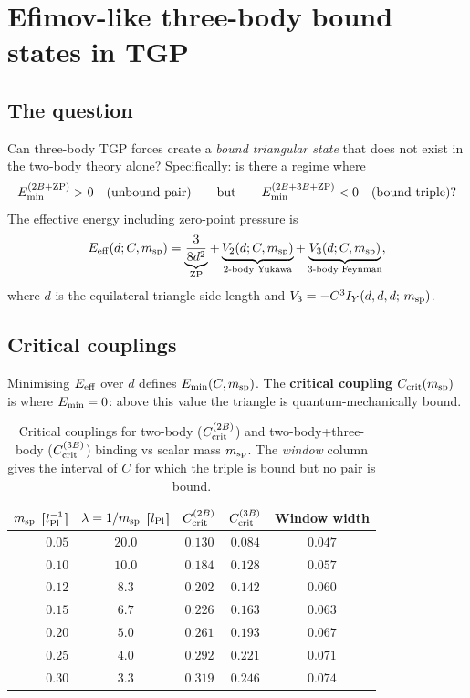\section{Efimov-like three-body bound states in TGP}
\label{sec:efimov}

\subsection{The question}

Can three-body TGP forces create a \emph{bound triangular state} that
does not exist in the two-body theory alone?  Specifically: is there a
regime where
\begin{equation}
  E_{\rm min}^{(2B+{\rm ZP})} > 0 \quad\text{(unbound pair)}
  \qquad\text{but}\qquad
  E_{\rm min}^{(2B+3B+{\rm ZP})} < 0 \quad\text{(bound triple)}?
\end{equation}
The effective energy including zero-point pressure is
\begin{equation}
  E_{\rm eff}(d;C,m_{\rm sp}) = \underbrace{\frac{3}{8d^2}}_{\rm ZP}
  + \underbrace{V_2(d;C,m_{\rm sp})}_{2\text{-body Yukawa}}
  + \underbrace{V_3(d;C,m_{\rm sp})}_{3\text{-body Feynman}},
\end{equation}
where $d$ is the equilateral triangle side length and
$V_3 = -C^3 I_Y(d,d,d;\,m_{\rm sp})$.

\subsection{Critical couplings}

Minimising $E_{\rm eff}$ over $d$ defines
$E_{\rm min}(C,m_{\rm sp})$.  The \textbf{critical coupling}
$C_{\rm crit}(m_{\rm sp})$ is where $E_{\rm min}=0$:
above this value the triangle is quantum-mechanically bound.

\begin{table}[h]
\centering
\caption{Critical couplings for two-body ($C_{\rm crit}^{(2B)}$) and
two-body+three-body ($C_{\rm crit}^{(3B)}$) binding vs scalar mass
$m_{\rm sp}$.  The \emph{window} column gives the interval of $C$ for
which the triple is bound but no pair is bound.}
\label{tab:Ccrit_window}
\begin{tabular}{rcccc}
\hline
$m_{\rm sp}$ [$l_{\rm Pl}^{-1}$] & $\lambda=1/m_{\rm sp}$ [$l_{\rm Pl}$]
  & $C_{\rm crit}^{(2B)}$ & $C_{\rm crit}^{(3B)}$ & Window width \\
\hline
$0.05$ & $20.0$ & $0.130$ & $0.084$ & $0.047$ \\
$0.10$ & $10.0$ & $0.184$ & $0.128$ & $\mathbf{0.057}$ \\
$0.12$ & $ 8.3$ & $0.202$ & $0.142$ & $0.060$ \\
$0.15$ & $ 6.7$ & $0.226$ & $0.163$ & $0.063$ \\
$0.20$ & $ 5.0$ & $0.261$ & $0.193$ & $0.067$ \\
$0.25$ & $ 4.0$ & $0.292$ & $0.221$ & $0.071$ \\
$0.30$ & $ 3.3$ & $0.319$ & $0.246$ & $0.074$ \\
\hline
\end{tabular}
\end{table}

